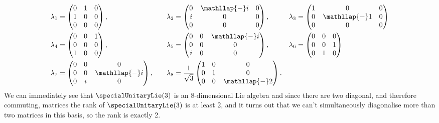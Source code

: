 \documentclass[fleqn]{NotesClass}
\begin{document}
    \begin{alignat}{3}
        \lambda_1 &= 
        \begin{pmatrix}
            0 & 1 & 0\\
            1 & 0 & 0\\
            0 & 0 & 0
        \end{pmatrix}
        , \quad & \lambda_2 &= \left(
        \begin{array}{@{}c@{\hskip 11pt}cc@{}}
            0 & \mathllap{-}i & 0\\
            i & 0 & 0\\
            0 & 0 & 0
        \end{array}
        \right)
        , \quad & \lambda_3 &= \left(
        \begin{array}{@{}c@{\hskip 11pt}cc@{}}
            1 & 0 & 0\\
            0 & \mathllap{-}1 & 0\\
            0 & 0 & 0
        \end{array}
        \right)
        \\
        \lambda_4 &= 
        \begin{pmatrix}
            0 & 0 & 1\\
            0 & 0 & 0\\
            1 & 0 & 0
        \end{pmatrix}
        , \quad & \lambda_5 &= \left(
        \begin{array}{@{}cc@{\hskip 11pt}c@{}}
            0 & 0 & \mathllap{-}i\\
            0 & 0 & 0\\
            i & 0 & 0
        \end{array}
        \right)
        , \quad & \lambda_6 &= 
        \begin{pmatrix}
            0 & 0 & 0\\
            0 & 0 & 1\\
            0 & 1 & 0
        \end{pmatrix}
        \\
        \lambda_7 &= \left(
        \begin{array}{@{}cc@{\hskip 11pt}c@{}}
            0 & 0 & 0\\
            0 & 0 & \mathllap{-}i\\
            0 & i & 0
        \end{array}
        \right)
        , \quad & \lambda_8 &= \frac{1}{\sqrt{3}} \left(
        \begin{array}{@{}cc@{\hskip 11pt}c@{}}
            1 & 0 & 0\\
            0 & 1 & 0\\
            0 & 0 & \mathllap{-}2
        \end{array}
        \right) .
    \end{alignat}
    We can immediately see that \(\specialUnitaryLie(3)\) is an 8-dimensional Lie algebra and since there are two diagonal, and therefore commuting, matrices the rank of \(\specialUnitaryLie(3)\) is at least 2, and it turns out that we can't simultaneously diagonalise more than two matrices in this basis, so the rank is exactly 2.
    
\end{document}
